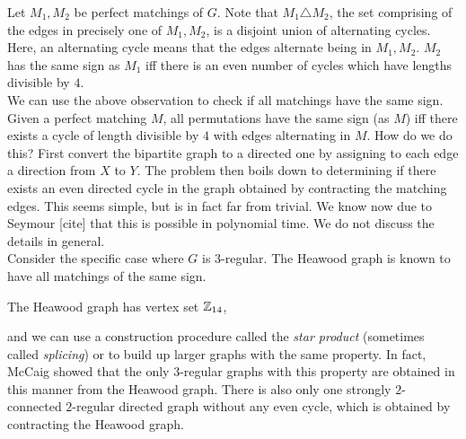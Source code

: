 Let $M_1,M_2$ be perfect matchings of $G$. Note that $M_1 \triangle M_2$, the set comprising of the edges in precisely one of $M_1,M_2$, is a disjoint union of alternating cycles. Here, an alternating cycle means that the edges alternate being in $M_1,M_2$. $M_2$ has the same sign as $M_1$ iff there is an even number of cycles which have lengths divisible by $4$.\\
We can use the above observation to check if all matchings have the same sign. Given a perfect matching $M$, all permutations have the same sign (as $M$) iff there exists a cycle of length divisible by $4$ with edges alternating in $M$. How do we do this? First convert the bipartite graph to a directed one by assigning to each edge a direction from $X$ to $Y$. The problem then boils down to determining if there exists an even directed cycle in the graph obtained by contracting the matching edges. This seems simple, but is in fact far from trivial. We know now due to Seymour [cite] that this is possible in polynomial time. We do not discuss the details in general. \\
Consider the specific case where $G$ is $3$-regular. The Heawood graph is known to have all matchings of the same sign.
\begin{fex}
	The Heawood graph has vertex set $\mathbb{Z}_{14}$, 
\end{fex}
and we can use a construction procedure called the \emph{star product} (sometimes called \emph{splicing}) or to build up larger graphs with the same property. In fact, McCaig showed that the only $3$-regular graphs with this property are obtained in this manner from the Heawood graph. There is also only one strongly $2$-connected $2$-regular directed graph without any even cycle, which is obtained by contracting the Heawood graph. %


